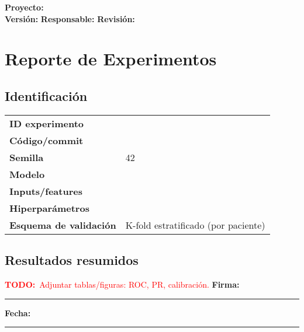 \documentclass[11pt]{article}
\newcommand{\project}{\textbf{Proyecto:} \underline{\hspace{7cm}}}
\newcommand{\version}{\textbf{Versi\'on:} \underline{\hspace{3cm}}}
\newcommand{\owner}{\textbf{Responsable:} \underline{\hspace{5cm}}}
\newcommand{\review}{\textbf{Revisi\'on:} \underline{\hspace{3cm}}}
\newcommand{\signatureline}{\vspace{0.5cm}\noindent\textbf{Firma:}\ \rule{6cm}{0.4pt} \hfill \textbf{Fecha:}\ \rule{3cm}{0.4pt}}
\newcommand{\todo}[1]{\textcolor{red}{\textbf{TODO:}~#1}}
\begin{document}
\begin{flushright}
\project \\ \version \hspace{1cm} \owner \hspace{1cm} \review
\end{flushright}


\section*{Reporte de Experimentos}
\subsection*{Identificaci\'on}
\begin{tabularx}{\linewidth}{@{}>{\bfseries}lX@{}}
ID experimento &  \\
C\'odigo/commit &  \\
Semilla & 42 \\
Modelo &  \\
Inputs/features &  \\
Hiperpar\'ametros &  \\
Esquema de validaci\'on & K-fold estratificado (por paciente) \\
\end{tabularx}

\subsection*{Resultados resumidos}
\todo{Adjuntar tablas/figuras: ROC, PR, calibraci\'on.}
\signatureline

\label{LastPage}
\end{document}
